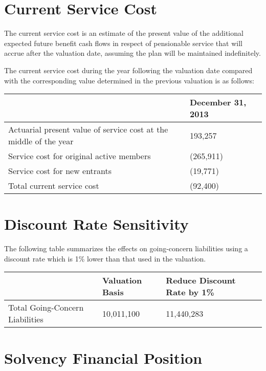 \documentclass{report}
\begin{document}
\section{Current Service Cost}
The current service cost is an estimate of the present value of the additional expected future benefit cash flows in respect of pensionable service that will accrue after the valuation date, assuming the plan will be maintained indefinitely.

\vspace{3mm}
The current service cost during the year following the valuation date compared with the corresponding value determined in the previous valuation is as follows:

\vspace{3mm}
\bgroup
\normalsize
\def\arraystretch{1.5}
\begin{tabular}{p{6.5cm} p{5cm}}
\hline
& December 31, 2013 \\ \hline
Actuarial present value of service cost at the middle of the year & 193,257 \\ \hline
Service cost for original active members & (265,911) \\ \hline
Service cost for new entrants & (19,771) \\ \hline
Total current service cost & (92,400) \\ \hline
\end{tabular}
\egroup

\section{Discount Rate Sensitivity}

The following table summarizes the effects on going-concern liabilities using a discount rate which is 1\% lower than that used in the valuation.

\vspace{3mm}
\bgroup
\normalsize
\def\arraystretch{1.5}
\begin{tabular}{p{6.5cm} p{3cm} p{4.5cm}}
\hline
& Valuation Basis & Reduce Discount Rate by 1\% \\ \hline
Total Going-Concern Liabilities & 10,011,100 & 11,440,283 \\ \hline
\end{tabular}
\egroup


\section{Solvency Financial Position}
\end{document}
